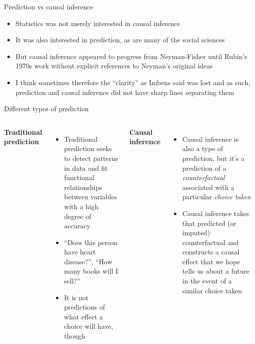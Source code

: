 \documentclass{beamer}
\begin{document}
\begin{frame}{Prediction vs causal inference}

\begin{itemize}

\item Statistics was not merely interested in causal inference
\item It was also interested in prediction, as are many of the social sciences
\item But causal inference appeared to progress from Neyman-Fisher until Rubin's 1970s work without explicit references to Neyman's original ideas
\item I think sometimes therefore the ``clarity'' as Imbens said was lost and as such, prediction and causal inference did not have sharp lines separating them

\end{itemize}

\end{frame}

\begin{frame}{Different types of prediction}

  \begin{columns}
    \centering
    \textbf{Traditional prediction}
    \begin{itemize}
      \item Traditional prediction seeks to detect patterns in data and fit functional relationships between variables with a high degree of accuracy
      \item ``Does this person have heart disease?'', ``How many books will I sell?''
      \item It is not predictions of what effect a choice will have, though
    \end{itemize}
    \centering
    \textbf{Causal inference}
    \begin{itemize}
      \item Causal inference is also a type of prediction, but it's a prediction of a \emph{counterfactual} associated with a particular \emph{choice taken}
      \item Causal inference takes that predicted (or imputed) counterfactual and constructs a causal effect that we hope tells us about a future in the event of a similar choice taken
    \end{itemize}
  \end{columns}
\end{frame}
\end{document}
